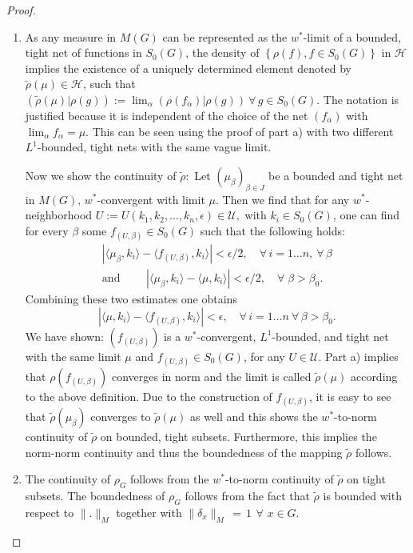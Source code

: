 \documentclass[graybox]{svmult}
\begin{document}
\begin{proof}
\begin{enumerate}
\item[(b)] As any measure in $M(G)$ can be represented as the
$w^*$-limit of a bounded, tight net of functions in $S_0(G)$,
the density  of
$\left\{  \rho (f) , f \in {S_{0}(G)} \right\} $
in $\mathcal{H}$ implies the existence of a uniquely
determined element denoted by
$\tilde{\rho}(\mu ) \in  \mathcal{H}$,
such that $(\tilde{\rho}(\mu )| \rho (g)) := \lim_{\alpha }(\rho
(f_{\alpha })| \rho (g))  \ \forall \,  g \in {S_{0}(G)}$. The notation is
justified because it is independent of the choice of the net
$(f_{\alpha })$ with $\lim_{\alpha} f_{\alpha} = \mu$.
This can be seen using the proof of part a)
with two different $L^1$-bounded, tight nets with the
same vague limit.

Now we show the continuity of $\tilde{\rho}:$
Let $(\mu _{\beta })_{\beta \in J}$  be a bounded and tight
net in $M(G),\,  w^\ast$-convergent  with  limit $\mu$.
Then we find that for any ${w}^*$-neighborhood
$  U := U(k_{1},k_{2},\ldots ,k_{n},\epsilon ) \in  \mathcal{U},$
 with $ k_{i} \in  {S_{0}(G)}  $, one can find for every $\beta$  some  $ f_{(U,\beta)} \in  {S_{0}(G)}$
such that the following holds:
\begin{gather*}
| \langle\mu _{\beta },k_{i}\rangle - \langle f_{(U,\beta)},k_{i}\rangle|
< \epsilon /2, \quad \forall \,  i=1\ldots n, \ \forall \, \beta\\
\text{and }\quad \quad | \langle\mu _{\beta },k_{i}\rangle - \langle\mu
,k_{i}\rangle|  < \epsilon /2,  \quad \forall \; \beta  > \beta _{0}.
\end{gather*}
Combining these two estimates one obtains
\[
| \langle \mu ,k_{i}\rangle - \langle
f_{(U,\beta)},k_{i}\rangle|  <  \epsilon,
 \quad \forall \,  i=1\ldots n \ \forall \,  \beta  > \beta _{0}.
\]
We have shown: $(f_{(U,\beta)})$ is a
$w^\ast$-convergent, $L^{1}$-bounded, and
tight net with the same limit
$\mu $ and $f_{(U,\beta)} \in {S_{0}(G)}$, for any
$U \in \mathcal{U}$.
Part a) implies that $\rho(f_{(U,\beta)})$ converges in
norm and
the limit is called $\tilde{\rho}(\mu )$ according to the above
definition.  Due to the construction of $f_{(U,\beta)}$, it is easy to
see that
$\tilde{\rho}(\mu _{\beta })$ converges to $\tilde{\rho}(\mu )$ as
well and this shows the ${w}^*$-to-norm continuity of $\tilde{\rho}$
on bounded, tight subsets. Furthermore, this implies the norm-norm
continuity and thus the boundedness of the mapping $\tilde{\rho}$
follows.

\item[(c)] The continuity of
$\rho _{G}$ follows from the ${w}^*$-to-norm continuity of
$\tilde{\rho}$ on tight subsets.
The boundedness of $\rho _{G}$ follows
from the fact that $\tilde{\rho}$ is bounded with respect to $\| .
\|_M$ together with
$\| \delta_x \|_M \,=\,1 \, \ \forall \, \, x \in G$.


\end{enumerate}
\end{proof}
\end{document}

